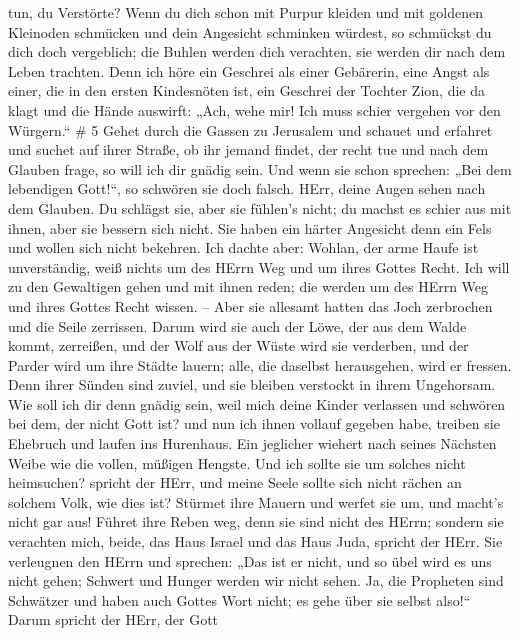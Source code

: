 tun, du Verstörte? Wenn du dich schon mit Purpur kleiden und mit
goldenen Kleinoden schmücken und dein Angesicht schminken würdest, so
schmückst du dich doch vergeblich; die Buhlen werden dich verachten, sie
werden dir nach dem Leben trachten.  Denn ich höre ein
Geschrei als einer Gebärerin, eine Angst als einer, die in den ersten
Kindesnöten ist, ein Geschrei der Tochter Zion, die da klagt und die
Hände auswirft: „Ach, wehe mir! Ich muss schier vergehen vor den
Würgern.`` \# 5  Gehet durch die Gassen zu Jerusalem und
schauet und erfahret und suchet auf ihrer Straße, ob ihr jemand findet,
der recht tue und nach dem Glauben frage, so will ich dir gnädig sein.
 Und wenn sie schon sprechen: „Bei dem lebendigen Gott!{}``,
so schwören sie doch falsch.  HErr, deine Augen sehen nach
dem Glauben. Du schlägst sie, aber sie fühlen's nicht; du machst es
schier aus mit ihnen, aber sie bessern sich nicht. Sie haben ein härter
Angesicht denn ein Fels und wollen sich nicht bekehren.  Ich
dachte aber: Wohlan, der arme Haufe ist unverständig, weiß nichts um des
HErrn Weg und um ihres Gottes Recht.  Ich will zu den
Gewaltigen gehen und mit ihnen reden; die werden um des HErrn Weg und
ihres Gottes Recht wissen. -- Aber sie allesamt hatten das Joch
zerbrochen und die Seile zerrissen.  Darum wird sie auch der
Löwe, der aus dem Walde kommt, zerreißen, und der Wolf aus der Wüste
wird sie verderben, und der Parder wird um ihre Städte lauern; alle, die
daselbst herausgehen, wird er fressen. Denn ihrer Sünden sind zuviel,
und sie bleiben verstockt in ihrem Ungehorsam.  Wie soll ich
dir denn gnädig sein, weil mich deine Kinder verlassen und schwören bei
dem, der nicht Gott ist? und nun ich ihnen vollauf gegeben habe, treiben
sie Ehebruch und laufen ins Hurenhaus.  Ein jeglicher
wiehert nach seines Nächsten Weibe wie die vollen, müßigen Hengste.
 Und ich sollte sie um solches nicht heimsuchen? spricht der
HErr, und meine Seele sollte sich nicht rächen an solchem Volk, wie dies
ist?  Stürmet ihre Mauern und werfet sie um, und macht's
nicht gar aus! Führet ihre Reben weg, denn sie sind nicht des HErrn;
 sondern sie verachten mich, beide, das Haus Israel und das
Haus Juda, spricht der HErr.  Sie verleugnen den HErrn und
sprechen: „Das ist er nicht, und so übel wird es uns nicht gehen;
Schwert und Hunger werden wir nicht sehen.  Ja, die
Propheten sind Schwätzer und haben auch Gottes Wort nicht; es gehe über
sie selbst also!{}``  Darum spricht der HErr, der Gott
